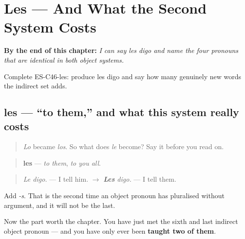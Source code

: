 
\chapter{Les --- And What the Second System Costs}
\label{ch:pronoun-les}

\begin{chapteropening}
\textbf{By the end of this chapter:} \emph{I can say les digo and name the four pronouns that are identical in both object systems.}

Complete ES-C46-les: produce les digo and say how many genuinely new words the indirect set adds.
\end{chapteropening}

\section[les]{les — \textquotedblleft{}to them,\textquotedblright{} and what this system really costs}

\label{lesson:ES-C46-les}



\begin{quote}
\emph{Lo} became \emph{los}. So what does \emph{le} become? Say it before you read on.
\end{quote}

\begin{grammarlens}[title={Grammar Lens: right again, and then something better}]
\begin{quote}
\textbf{les} — \emph{to them}, \emph{to you all}.
\end{quote}

\begin{quote}
\emph{Le digo.} — I tell him. $\to$ \emph{\textbf{Les} digo.} — I tell them.
\end{quote}

Add \emph{-s}. That is the second time an object pronoun has pluralised without argument, and it will not be the last.

Now the part worth the chapter. You have just met the sixth and last indirect object pronoun — and you have only ever been \textbf{taught two of them}.
\end{grammarlens}

